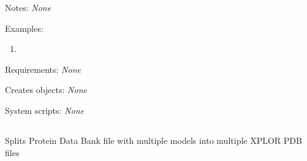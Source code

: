 \begin{description}

\item{Notes:} {\em None}


\item{Examples:}
\begin{enumerate}

\item
\begin{verbatim}
\end{verbatim}

\end{enumerate}


\item{Requirements:} {\em None}


\item{Creates objects:} {\em None}


\item{System scripts:} {\em None}

\end{description}



\subsection[pdb\_model]{  }



Splits Protein Data Bank file with multiple models into
multiple XPLOR PDB files


